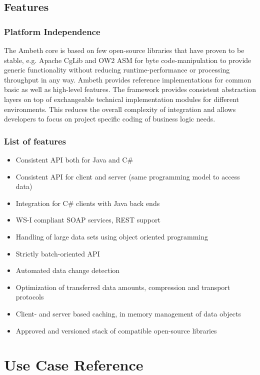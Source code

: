 \subsection{Features}
\subsubsection{Platform Independence}

The Ambeth core is based on few open-source libraries that have proven to be stable, e.g. Apache CgLib and OW2 ASM for byte code-manipulation to provide generic functionality without reducing runtime-performance or processing throughput in any way. Ambeth provides reference implementations for common basic as well as high-level features. The framework provides consistent abstraction layers on top of exchangeable technical implementation modules for different environments. This reduces the overall complexity of integration and allows developers to focus on project specific coding of business logic needs.

\subsubsection{List of features}

\begin{itemize}
	\item Consistent API both for Java and C\#
	\item Consistent API for client and server (same programming model to access data)
	\item Integration for C\# clients with Java back ends
	\item WS-I compliant SOAP services, REST support
	\item Handling of large data sets using object oriented programming
	\item Strictly batch-oriented API
	\item Automated data change detection
	\item Optimization of transferred data amounts, compression and transport protocols
	\item Client- and server based caching, in memory management of data objects
	\item Approved and versioned stack of compatible open-source libraries
\end{itemize}

\section{Use Case Reference}

